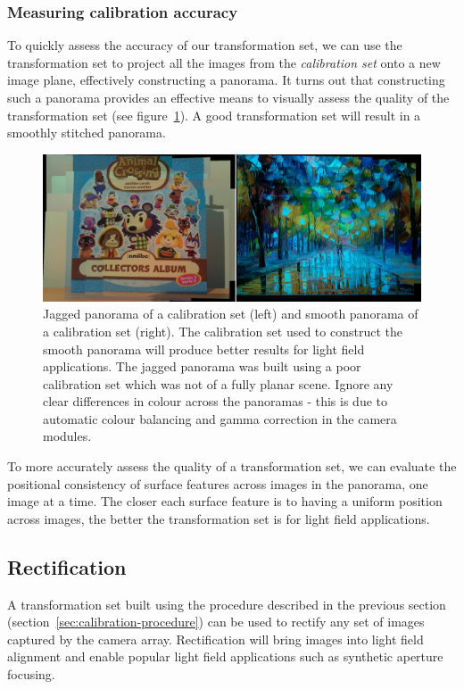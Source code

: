 \documentclass[../main.tex]{subfiles}
\begin{document}
\subsubsection{Measuring calibration accuracy} \label{sec:assessing-calibration}
To quickly assess the accuracy of our transformation set, we can use the transformation set to project all the images from the \emph{calibration set} onto a new image plane, effectively constructing a panorama. It turns out that constructing such a panorama provides an effective means to visually assess the quality of the transformation set (see figure~\ref{fig:panoramas}). A good transformation set will result in a smoothly stitched panorama. 

\begin{figure}[H]
    \centering
    \includegraphics[width=\linewidth]{images/panoramas}
    \caption{Jagged panorama of a calibration set (left) and smooth panorama of a calibration set (right). The calibration set used to construct the smooth panorama will produce better results for light field applications. The jagged panorama was built using a poor calibration set which was not of a fully planar scene. Ignore any clear differences in colour across the panoramas - this is due to automatic colour balancing and gamma correction in the camera modules.}
    \label{fig:panoramas}
\end{figure}

To more accurately assess the quality of a transformation set, we can evaluate the positional consistency of surface features across images in the panorama, one image at a time. The closer each surface feature is to having a uniform position across images, the better the transformation set is for light field applications.

\newpage
\subsection{Rectification} \label{sec:rectification}
A transformation set built using the procedure described in the previous section (section~\ref{sec:calibration-procedure}) can be used to rectify any set of images captured by the camera array. Rectification will bring images into light field alignment and enable popular light field applications such as synthetic aperture focusing.
\end{document}
